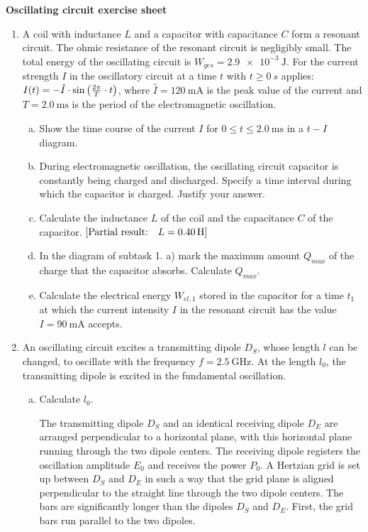 \documentclass[a4paper]{article}
\begin{document}
	{\bf Oscillating circuit exercise sheet }\\
	\begin{enumerate}[1.]
		\item A coil with inductance $L$ and a capacitor with capacitance $C$ form a resonant circuit. The ohmic resistance of the resonant circuit is negligibly small. The total energy of the oscillating circuit is $W_{ges}=\SI{2.9e-3}{\joule}$. For the current strength
		$I$ in the oscillatory circuit at a time $t$ with $ t\ge 0~s$ applies:
		$ I(t)= -\hat{I}\cdot \sin{ \left( {2 \pi \over T} \cdot t \right)}$, where $\hat{I}=\SI{120} {\milli\ampere}$ is the peak value of the current and $T=\SI{2.0}{\milli\second}$ is the period of the electromagnetic oscillation.
		
		\begin{enumerate}[a)]
			\item Show the time course of the current $I$ for $0 \le t \le \SI{2,0}{\milli\second}$ in a $t-I$ diagram.
			\item During electromagnetic oscillation, the oscillating circuit capacitor is constantly being charged and discharged. Specify a time interval during which the capacitor is charged. Justify your answer.
			\item Calculate the inductance $L$ of the coil and the capacitance $C$ of the capacitor. $[\textnormal{Partial result:} \quad L=\SI{0,40}{\henry}]$
			\item In the diagram of subtask 1. a) mark the maximum amount $Q_{max}$ of the charge that the capacitor absorbs. Calculate $Q_{max}$.
			\item Calculate the electrical energy $W_{el,1}$ stored in the capacitor for a time $t_1$ at which the current intensity $I$ in the resonant circuit has the value $I=\SI{90}{\milli\ampere} $ accepts.
		\end{enumerate}
		
		\item An oscillating circuit excites a transmitting dipole $D_S$, whose length $l$ can be changed, to oscillate with the frequency $f=\SI{2.5}{\giga\hertz}$. At the length $l_0$, the transmitting dipole is excited in the fundamental oscillation.
		\begin{enumerate}[a)]
			\item Calculate $l_0$.
			
			The transmitting dipole $D_S$ and an identical receiving dipole $D_E$ are arranged perpendicular to a horizontal plane, with this horizontal plane running through the two dipole centers. The receiving dipole registers the oscillation amplitude $E_0$ and receives the power $P_0$. A Hertzian grid is set up between $D_S$ and $D_E$ in such a way that the grid plane is aligned perpendicular to the straight line through the two dipole centers. The bars are significantly longer than the dipoles $D_S$ and $D_E$. First, the grid bars run parallel to the two dipoles.
			

\end{enumerate}
\end{enumerate}
\end{document}
